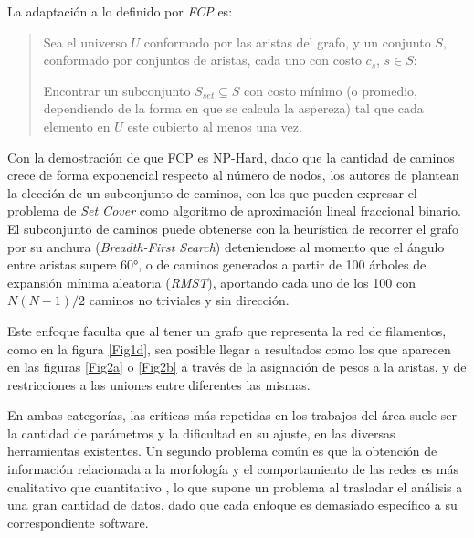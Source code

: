 \documentclass{article}
\begin{document}
La adaptaci\'on a lo definido por {\it FCP} es: 
\begin{quote}
Sea el universo $U$ conformado por las aristas del grafo, y un conjunto $S$, conformado por conjuntos de aristas, cada uno con costo $c_s$, $s \in S$:

Encontrar un subconjunto $S_{set} \subseteq S$ con costo m\'inimo (o promedio, dependiendo de la forma en que se calcula la aspereza) tal que cada elemento en $U$ este cubierto al menos una vez.
\end{quote}

Con la demostraci\'on de que FCP es NP-Hard, dado que la cantidad de caminos crece de forma exponencial respecto al n\'umero de nodos, los autores de \cite{breuer2015define} plantean la elecci\'on de un subconjunto de caminos, con los que pueden expresar el problema de {\it Set Cover} como algoritmo de aproximaci\'on lineal fraccional binario. El subconjunto de caminos puede obtenerse con la heur\'istica de recorrer el grafo por su anchura ({\it Breadth-First Search}) deteniendose al momento que el \'angulo entre aristas supere 60$°$, o de caminos generados a partir de 100 \'arboles de expansi\'on m\'inima aleatoria ({\it RMST}), aportando cada uno de los 100 con $N(N-1)/2$ caminos no triviales y sin direcci\'on. 

Este enfoque faculta que al tener un grafo que representa la red de filamentos, como en la figura \ref{Fig1d}, sea posible llegar a resultados como los que aparecen en las figuras \ref{Fig2a} o \ref{Fig2b} a trav\'es de la asignaci\'on de pesos a la aristas, y de restricciones a las uniones entre diferentes las mismas. 

En ambas categor\'ias, las cr\'iticas m\'as repetidas en los trabajos del \'area suele ser la cantidad de par\'ametros y la dificultad en su ajuste, en las diversas herramientas existentes. Un segundo problema com\'un es que la obtenci\'on de informaci\'on relacionada a la morfolog\'ia y el comportamiento de las redes es m\'as cualitativo que cuantitativo \cite{asgharzadeh2018computational}\cite{qiu2014quantitative}, lo que supone un problema al trasladar el  an\'alisis a una gran cantidad de datos, dado que cada enfoque es demasiado espec\'ifico a su correspondiente software.

\medskip
\end{document}
